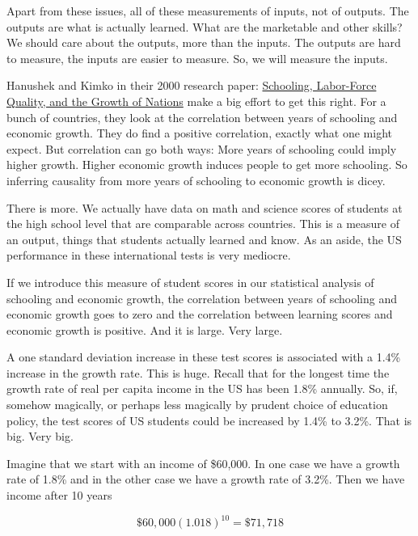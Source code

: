 \documentclass[
]{book}
\begin{document}
Apart from these issues, all of these measurements of inputs, not of outputs. The outputs are what is actually learned. What are the marketable and other skills? We should care about the outputs, more than the inputs. The outputs are hard to measure, the inputs are easier to measure. So, we will measure the inputs.

Hanushek and Kimko in their 2000 research paper: \href{https://www.researchgate.net/profile/Eric-Hanushek/publication/4980899_Schooling_Labor-Force_Quality_and_the_Growth_of_Nations/links/551427960cf283ee0834ac50/Schooling-Labor-Force-Quality-and-the-Growth-of-Nations.pdf}{Schooling, Labor-Force Quality, and the Growth of Nations} make a big effort to get this right. For a bunch of countries, they look at the correlation between years of schooling and economic growth. They do find a positive correlation, exactly what one might expect. But correlation can go both ways: More years of schooling could imply higher growth. Higher economic growth induces people to get more schooling. So inferring causality from more years of schooling to economic growth is dicey.

There is more. We actually have data on math and science scores of students at the high school level that are comparable across countries. This is a measure of an output, things that students actually learned and know. As an aside, the US performance in these international tests is very mediocre.

If we introduce this measure of student scores in our statistical analysis of schooling and economic growth, the correlation between years of schooling and economic growth goes to zero and the correlation between learning scores and economic growth is positive. And it is large. Very large.

A one standard deviation increase in these test scores is associated with a 1.4\% increase in the growth rate. This is huge. Recall that for the longest time the growth rate of real per capita income in the US has been 1.8\% annually. So, if, somehow magically, or perhaps less magically by prudent choice of education policy, the test scores of US students could be increased by 1.4\% to 3.2\%. That is big. Very big.

Imagine that we start with an income of \$60,000. In one case we have a growth rate of 1.8\% and in the other case we have a growth rate of 3.2\%. Then we have income after 10 years

\[\$60,000 (1.018)^{10} = \$71,718 \]
\end{document}
